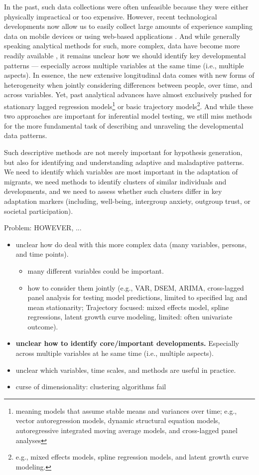 \documentclass[man, 12pt, a4paper]{apa7}
\theoremstyle{break}
\theoremstyle{plain}
\begin{document}
In the past, such data collections were often unfeasible because they were either physically impractical or too expensive. However, recent technological developments now allow us to easily collect large amounts of experience sampling data on mobile devices \citep[e.g.,][]{Keil2020} or using web-based applications \citep[e.g.,][]{Arslan2020}. And while generally speaking analytical methods for such, more complex, data have become more readily available \citep[e.g.,][]{ODonnell2021}, it remains unclear how we should identify key developmental patterns --- especially across multiple variables at the same time (i.e., multiple aspects). In essence, the new extensive longitudinal data comes with new forms of heterogeneity when jointly considering differences between people, over time, and across variables. Yet, past analytical advances have almost exclusively pushed for stationary lagged regression models\footnote{meaning models that assume stable means and variances over time; e.g., vector autoregression models, dynamic structural equation models, autoregressive integrated moving average models, and cross-lagged panel analyses} or basic trajectory models\footnote{e.g., mixed effects models, spline regression models, and latent growth curve modeling.}. And while these two approaches are important for inferential model testing, we still miss methods for the more fundamental task of describing and unraveling the developmental data patterns. 

Such descriptive methods are not merely important for hypothesis generation, but also for identifying and understanding adaptive and maladaptive patterns. We need to identify which variables are most important in the adaptation of migrants, we need methods to identify clusters of similar individuals and developments, and we need to assess whether such clusters differ in key adaptation markers (including, well-being, intergroup anxiety, outgroup trust, or societal participation). 


Problem: HOWEVER, ...

\begin{itemize}
    \item unclear how do deal with this more complex data (many variables, persons, and time points).
    \begin{itemize}
        \item many different variables could be important.
        \item how to consider them jointly (e.g., VAR, DSEM, ARIMA, cross-lagged panel analysis for testing model predictions, limited to specified lag and mean stationarity; Trajectory focused: mixed effects model, spline regressions, latent growth curve modeling, limited: often univariate outcome). 
    \end{itemize}
    \item \textbf{unclear how to identify core/important developments.} Especially across multiple variables at he same time (i.e., multiple aspects).
    \item unclear which variables, time scales, and methods are useful in practice.
    \item curse of dimensionality: clustering algorithms fail 
\end{itemize}
\end{document}
